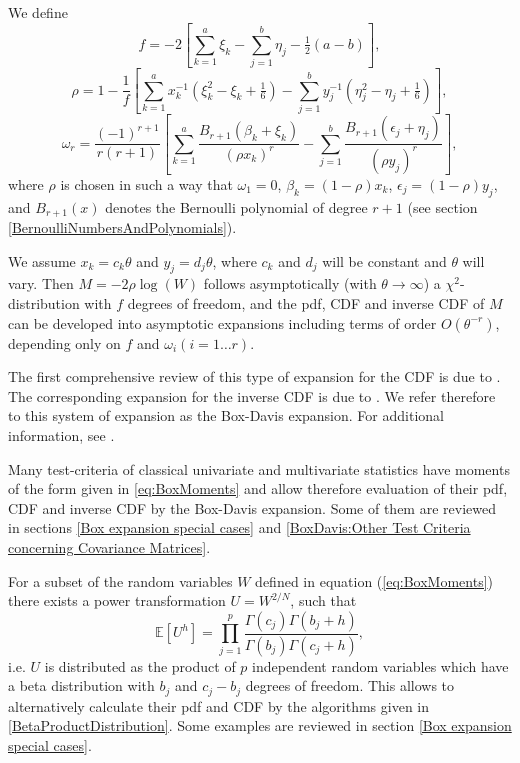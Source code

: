 We define 
\begin{equation}
	f = -2 \left[\sum_{k=1}^a \xi_k - \sum_{j=1}^b \eta_j  -\tfrac{1}{2}(a-b) \right],
\end{equation}
\begin{equation}
	\rho = 1-\frac{1}{f} \left[\sum_{k=1}^a x_k^{-1}\left(\xi_k^2-\xi_k+\tfrac{1}{6}\right) - \sum_{j=1}^b y_j^{-1}\left(\eta_j^2-\eta_j+\tfrac{1}{6}\right)   \right],
\end{equation}
\begin{equation}
	\omega_r = \frac{(-1)^{r+1}}{r(r+1)} \left[\sum_{k=1}^a \frac{B_{r+1}(\beta_k+\xi_k)}{(\rho x_k)^r} - \sum_{j=1}^b \frac{B_{r+1}(\epsilon_j+\eta_j)}{(\rho y_j)^r}   \right],
\end{equation}
where $\rho$ is chosen in such a way that $\omega_1 = 0$, $\beta_k = (1-\rho)x_k$, $\epsilon_j=(1-\rho)y_j$, and $B_{r+1}(x)$ denotes the Bernoulli polynomial of degree $r+1$ (see section \ref{BernoulliNumbersAndPolynomials}).

\vpara
We assume $x_k=c_k \theta$ and $y_j=d_j \theta$, where $c_k$ and $d_j$ will be constant and $\theta$ will vary. Then $M=-2 \rho \log(W)$ follows asymptotically (with $\theta \rightarrow \infty$) a $\chi^2$-distribution with $f$ degrees of freedom, and the pdf, CDF and inverse CDF of $M$ can be developed into asymptotic expansions including terms of order $O(\theta^{-r})$, depending only on $f$ and $\omega_i (i=1 \ldots r)$.

\vpara
The first comprehensive review of this type of expansion for the CDF is due to \cite{Box_1949}. The corresponding expansion for the inverse CDF is due to \cite{Davis_1971}. We refer therefore to this system of expansion as the Box-Davis expansion. For additional information, see \cite{Anderson_book_2003}.

\vpara
Many test-criteria of classical univariate and multivariate statistics have moments of the form given in \ref{eq:BoxMoments} and allow therefore evaluation of their pdf, CDF and inverse CDF by the Box-Davis expansion. Some of them are reviewed in  sections  \ref{Box expansion special cases} and \ref{BoxDavis:Other Test Criteria concerning Covariance Matrices}. 

\vpara
For a subset of the random variables $W$ defined in equation (\ref{eq:BoxMoments}) there exists a power transformation $U=W^{2/N}$, such that
\begin{equation}
	\mathbb{E}[U^h]  = \prod_{j=1}^p \frac{\Gamma(c_j)\Gamma(b_j +h)}{\Gamma(b_j)\Gamma(c_j+h)},
\end{equation}
i.e. $U$ is distributed as the product of $p$ independent random variables which have a beta distribution with $b_j$ and $c_j-b_j$ degrees of freedom. This allows to alternatively calculate their pdf and CDF by the algorithms given in \ref{BetaProductDistribution}. Some examples are reviewed in  section \ref{Box expansion special cases}. 


